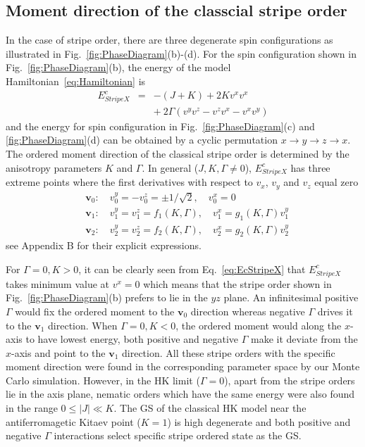 \documentclass[aps,prb,reprint,amsfonts,amsmath,amssymb,showpacs,groupedaddress,superscriptaddress]{revtex4-1}
\begin{document}
\subsection{\label{sec:SectionIIIB}Moment direction of the classcial stripe order}
In the case of stripe order, there are three degenerate spin configurations as illustrated in Fig.~\ref{fig:PhaseDiagram}(b)-(d). For the spin configuration shown in Fig.~\ref{fig:PhaseDiagram}(b), the energy of the model Hamiltonian~\eqref{eq:Hamiltonian} is
\begin{eqnarray}
    E_{StripeX}^{c} & = & -(J + K) + 2 K v^x v^x \nonumber \\
        & & +\: 2 \Gamma (v^y v^z - v^z v^x - v^x v^y) \label{eq:EcStripeX}
\end{eqnarray}
and the energy for spin configuration in Fig.~\ref{fig:PhaseDiagram}(c) and \ref{fig:PhaseDiagram}(d) can be obtained by a cyclic permutation $x \rightarrow y \rightarrow z \rightarrow x$. The ordered moment direction of the classical stripe order is determined by the anisotropy parameters $K$ and $\Gamma$. In general ($J,K,\Gamma \neq 0$), $E_{StripeX}^{c}$ has three extreme points where the first derivatives with respect to $v_x$, $v_y$ and $v_z$ equal zero
\begin{subequations}
    \label{eq:whole}
    \begin{align}
        & \mathbf{v}_0: \quad v_{0}^{y}=-v_{0}^{z} = \pm1/\sqrt{2}, \quad v_{0}^{x} = 0 \label{eq:v0} \\
        & \mathbf{v}_1: \quad v_{1}^{y}=v_{1}^{z} = f_{1}(K, \Gamma), \quad v_{1}^{x} = g_{1}(K, \Gamma) v_{1}^{y} \label{eq:v1} \\
        & \mathbf{v}_2: \quad v_{2}^{y}=v_{2}^{z} = f_{2}(K, \Gamma), \quad v_{2}^{x} = g_{2}(K, \Gamma) v_{2}^{y} \label{eq:v2}
    \end{align}
\end{subequations}
see Appendix B for their explicit expressions.

For $\Gamma=0, K>0$, it can be clearly seen from Eq.~\eqref{eq:EcStripeX} that $E_{StripeX}^{c}$ takes minimum value at $v^x = 0$ which means that the stripe order shown in Fig.~\ref{fig:PhaseDiagram}(b) prefers to lie in the $yz$ plane. An infinitesimal positive $\Gamma$ would fix the ordered moment to the $\mathbf{v}_0$ direction whereas negative $\Gamma$ drives it to the $\mathbf{v}_1$ direction. When $\Gamma=0, K<0$, the ordered moment would along the $x$-axis to have lowest energy, both positive and negative $\Gamma$ make it deviate from the $x$-axis and point to the $\mathbf{v}_1$ direction. All these stripe orders with the specific moment direction were found in the corresponding parameter space by our Monte Carlo simulation. However, in the HK limit ($\Gamma=0$), apart from the stripe orders lie in the axis plane, nematic orders which have the same energy were also found in the range $0 \leq |J| \ll K$. The GS of the classical HK model near the antiferromagetic Kitaev point ($K=1$) is high degenerate and both positive and negative $\Gamma$ interactions select specific stripe ordered state as the GS.
\end{document}
